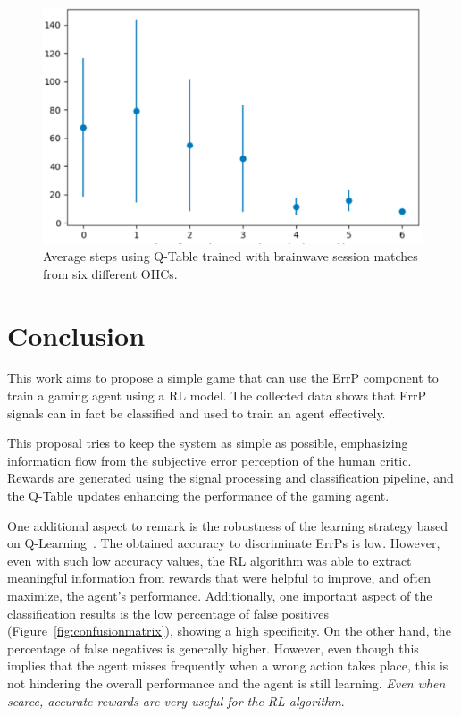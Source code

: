 \documentclass[journal]{IEEEtran}
\begin{document}
{{\begin{figure}[h!]
\centering
\includegraphics[scale=0.4]{Images/Average_steps/all.eps}
\caption{Average steps using Q-Table trained with brainwave session matches from six different OHCs.}
\label{fig:avg_steps_all}
\end{figure}

\section{Conclusion}
\label{conclusions}


This work aims to propose a simple game that can use the ErrP component to train a gaming agent using a RL model. The collected data shows that ErrP signals can in fact be classified and used to train an agent effectively.

This proposal tries to keep the system as simple as possible, emphasizing information flow from the subjective error perception of the human critic. Rewards are generated using the signal processing and classification pipeline, and the Q-Table updates enhancing the performance of the gaming agent.

One additional aspect to remark is the robustness of the learning strategy based on Q-Learning~\cite{Bauer2015,Rubin2012}.  The obtained accuracy to discriminate ErrPs is low.  However, even with such low accuracy values, the RL algorithm was able to extract meaningful information from rewards that were helpful to improve, and often maximize, the agent's performance.  Additionally, one important aspect of the classification results is the low percentage of false positives (Figure~\ref{fig:confusionmatrix}), showing a high specificity. On the other hand, the percentage of false negatives is generally higher.  However, even though this implies that the agent misses frequently when a wrong action takes place, this is not hindering the overall performance and the agent is still learning. \textit{Even when scarce, accurate rewards are very useful for the RL algorithm}.


}}
\end{document}
